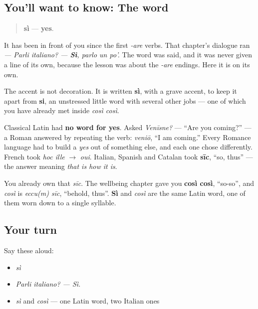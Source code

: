 \subsection*{You'll want to know: The word}
\begin{quote}
\textbf{sì} — \textbf{yes}.
\end{quote}

It has been in front of you since the first \emph{-are} verbs. That chapter's dialogue ran \emph{— Parli italiano? — \textbf{Sì}, parlo un po'.} The word was said, and it was never given a line of its own, because the lesson was about the \emph{-are} endings. Here it is on its own.

The accent is not decoration. It is written \textbf{sì}, with a grave accent, to keep it apart from \textbf{si}, an unstressed little word with several other jobs — one of which you have already met inside \emph{così così}.

\begin{cousinweb}
Classical Latin had \textbf{no word for yes}. Asked \emph{Venīsne?} — \textquotedblleft{}Are you coming?\textquotedblright{} — a Roman answered by repeating the verb: \emph{veniō}, \textquotedblleft{}I am coming.\textquotedblright{} Every Romance language had to build a \emph{yes} out of something else, and each one chose differently. French took \emph{hoc ille} $\to$ \emph{oui}. Italian, Spanish and Catalan took \textbf{sīc}, \textquotedblleft{}so, thus\textquotedblright{} — the answer meaning \emph{that is how it is}.

You already own that \emph{sīc}. The wellbeing chapter gave you \textbf{così così}, \textquotedblleft{}so-so\textquotedblright{}, and \emph{così} is \emph{eccu(m) sīc}, \textquotedblleft{}behold, thus\textquotedblright{}. \textbf{Sì} and \emph{così} are the same Latin word, one of them worn down to a single syllable.
\end{cousinweb}

\subsection*{Your turn}
Say these aloud:

\begin{itemize}
\raggedright
  \item \emph{sì}
  \item \emph{Parli italiano? — Sì.}
  \item \emph{sì} and \emph{così} — one Latin word, two Italian ones
\end{itemize}

